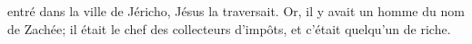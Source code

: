 \encetemps entré dans la ville de Jéricho, Jésus la traversait.
Or, il y avait un homme du nom de Zachée;
	il était le chef des collecteurs d’impôts, et c’était quelqu’un de riche.
